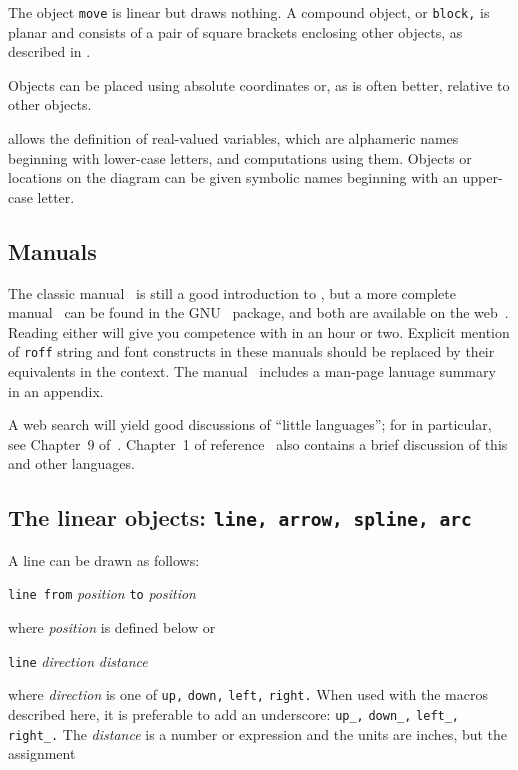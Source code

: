 The object {\tt move} is linear but draws nothing.  A compound object,
or {\tt block,} is planar and consists of a pair of square brackets enclosing
other objects, as described in .

Objects can be placed using absolute coordinates or,
as is often better, relative to other objects.

\Pic allows the definition of real-valued variables, which are alphameric
names beginning with lower-case letters, and computations using them.
Objects or locations on the diagram can be given symbolic names
beginning with an upper-case letter.

\subsection{Manuals\label{Manuals:}}
The classic \pic manual~\cite{KRpic} is still a good introduction to \pic, but
a more complete manual~\cite{Raymond95} can be found in the GNU \groff\
package, and both are available on the web~\cite{KRpic,Raymond95}.  Reading
either will give you competence with \pic in an hour or two.  Explicit mention
of {\tt *roff} string and font constructs in these manuals should be replaced by
their equivalents in the \latex context.
The \dpic manual~\cite{Aplevich2022} includes a man-page lanuage
summary in an appendix.

A web search will yield good discussions of ``little languages'';
for \pic in particular, see Chapter~9 of~\cite{Bentley88}.
Chapter~1 of reference~\cite{Goossens97} also contains a brief
discussion of this and other languages.

\subsection{The linear objects: {\tt line, arrow, spline, arc}%
\label{Linearobjects:}}
A line can be drawn as follows:

{\tt line from} {\sl position} {\tt to} {\sl position}

\noindent
where {\sl position} is defined below or

{\tt line} {\sl direction} {\sl distance}

\noindent
where {\sl direction} is one of {\tt up,} {\tt down,} {\tt left,}
{\tt right.}  When used with the \Mfour macros described here, it is
preferable to add an underscore: {\tt up\_,} {\tt down\_,} {\tt left\_,}
{\tt right\_.}  The {\sl distance} is a number or expression
and the units are inches, but the assignment

